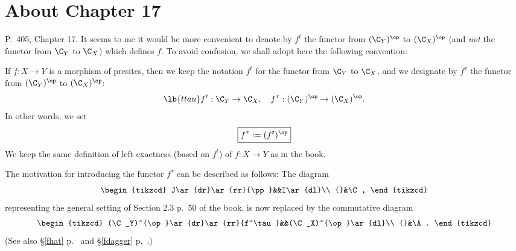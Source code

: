 \documentclass[12pt]{article}
\theoremstyle{remark}
\theoremstyle{definition}
\begin{document}

\section{About Chapter 17}


\begin{s}
P.~405, Chapter 17. It seems to me it would be more convenient to denote by $f^t$ the functor from $(\C_Y)^{\op}$ to $(\C_X)^{\op}$ (and {\em not} the functor from $\C_Y$ to $\C_X$) which defines $f$. To avoid confusion, we shall adopt here the following convention:

If $f:X\to Y$ is a morphism of presites,  then we keep the notation $f^t$ for the functor from $\C_Y$ to $\C_X$, and we designate by $f^\tau$  the functor from $(\C_Y)^{\op}$ to $(\C_X)^{\op}$:
\begin{equation}\lb{ttau}
f^t:\C_Y\to\C_X,\quad f^\tau:(\C_Y)^{\op}\to(\C_X)^{\op}.
\end{equation}
In other words, we set 
$$
\boxed{f^\tau:=(f^t)^{\op}}
$$ 
We keep the same definition of left exactness (based on $f^t$) of $f:X\to Y$ as in the book.

The motivation for introducing the functor $f^\tau$ can be described as follows: The diagram 
$$
\begin{tikzcd}
J\ar{dr}\ar{rr}{\pp}&&I\ar{dl}\\ 
{}&\C,
\end{tikzcd}
$$ 
representing the general setting of Section 2.3 p.~50 of the book, is now replaced by the commutative diagram 
$$
\begin{tikzcd}
(\C_Y)^{\op}\ar{dr}\ar{rr}{f^\tau}&&(\C_X)^{\op}\ar{dl}\\ 
{}&\A.
\end{tikzcd}
$$ 
(See also \S\ref{fhat} p.~ and \S\ref{fdagger} p.~.)
\end{s}

%
\end{document}

